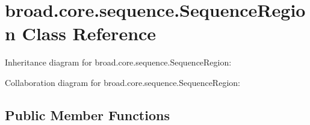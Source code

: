 \hypertarget{classbroad_1_1core_1_1sequence_1_1_sequence_region}{\section{broad.\+core.\+sequence.\+Sequence\+Region Class Reference}
\label{classbroad_1_1core_1_1sequence_1_1_sequence_region}
}


Inheritance diagram for broad.\+core.\+sequence.\+Sequence\+Region\+:


Collaboration diagram for broad.\+core.\+sequence.\+Sequence\+Region\+:
\subsection*{Public Member Functions}
